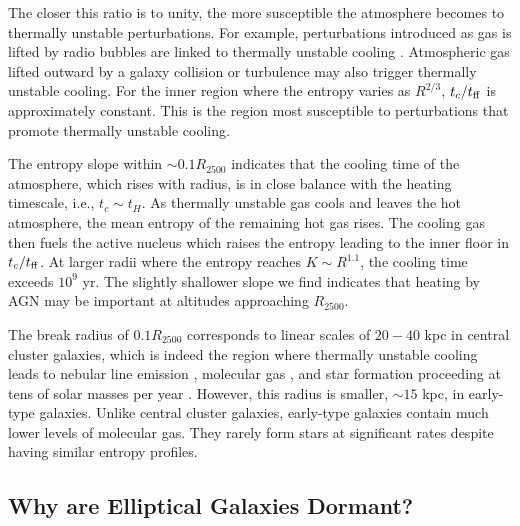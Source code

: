 \documentclass[apjl]{emulateapj}
\begin{document}
The closer this ratio is to unity, the more susceptible the atmosphere becomes to thermally unstable perturbations.  For example, perturbations introduced as gas is lifted by radio bubbles are linked to thermally unstable cooling \citep{Pizzolato:05, McCourt:11, McNamara:16}.  Atmospheric gas lifted outward by a galaxy collision or turbulence may also trigger thermally unstable cooling.  For the inner region where the entropy varies as $R^{2/3}$,  $t_c/t_{\rm ff}$ is approximately constant.  This is the region most susceptible to perturbations that promote thermally unstable cooling.  

The entropy slope within $\sim 0.1R_{2500}$  indicates that the cooling time of the atmosphere, which rises with radius, is in close balance with the heating timescale, i.e., $t_c \sim t_H$.   As thermally unstable gas cools and leaves the hot atmosphere, the mean entropy of the remaining hot gas rises.  The cooling gas then fuels the active nucleus which raises the entropy leading to the inner floor in $t_c/t_{\rm ff}$.  At larger radii where the entropy reaches $K \sim R^{1.1}$, the cooling time exceeds $10^9$ yr.  The slightly shallower slope we find indicates that
heating by AGN may be important at altitudes approaching $R_{2500}$.    

The break radius of $0.1R_{2500}$ corresponds to linear scales of $20-40$ kpc in central cluster galaxies, which is indeed the region where thermally unstable cooling leads to nebular line emission \citep{McDonald:11}, molecular gas \citep{Edge:02}, and star formation proceeding at tens of solar masses per year \citep{ODea:08}.  However, this radius is smaller,  $\sim 15$ kpc, in early-type galaxies. Unlike central cluster galaxies, early-type galaxies contain much lower levels of molecular gas. They rarely form stars at significant rates \citep{Werner:14} despite having similar entropy profiles.

\subsection{Why are Elliptical Galaxies Dormant?}
\end{document}
